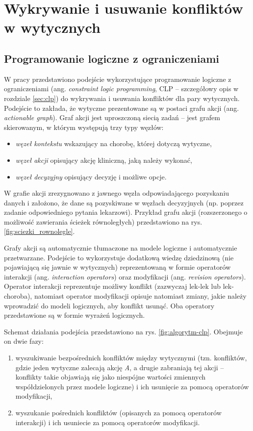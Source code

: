 \section{Wykrywanie i usuwanie konfliktów w wytycznych}

\subsection{Programowanie logiczne z ograniczeniami}

W pracy \cite{SzWilk2} przedstawiono podejście wykorzystujące programowanie logiczne z ograniczeniami (ang. \textit{constraint logic programming}, CLP -- szczegółowy opis w rozdziale \ref{sec:clp}) do wykrywania i usuwania konfliktów dla pary wytycznych. Podejście to zakłada, że wytyczne prezentowane są w postaci grafu akcji (ang. \textit{actionable graph}). Graf akcji jest uproszczoną siecią zadań -- jest grafem skierowanym, w którym występują trzy typy węzłów:
\begin{itemize}
\item \textit{węzeł kontekstu} wskazujący na chorobę, której dotyczą wytyczne,
\item \textit{węzeł akcji} opisujący akcję kliniczną, jaką należy wykonać,
\item \textit{węzeł decyzyjny} opisujący decyzję i możliwe opcje.
\end{itemize}

W grafie akcji zrezygnowano z jawnego węzła odpowiadającego pozyskaniu danych i założono, że dane są pozyskiwane w węzłach decyzyjnych (np. poprzez zadanie odpowiedniego pytania lekarzowi). Przykład grafu akcji (rozszerzonego o możliwość zawierania ścieżek równoległych) przedstawiono na rys. \ref{fig:sciezki_rownolegle}.

Grafy akcji są automatycznie tłumaczone na modele logiczne i automatycznie przetwarzane. Podejście to wykorzystuje dodatkową wiedzę dziedzinową (nie pojawiającą się jawnie w wytycznych) reprezentowaną w formie operatorów interakcji (ang. \textit{interaction operators}) oraz modyfikacji (ang. \textit{revision operators}). Operator interakcji reprezentuje możliwy konflikt (zazwyczaj lek-lek lub lek-choroba), natomiast operator modyfikacji opisuje natomiast zmiany, jakie należy wprowadzić do modeli logicznych, aby konflikt usunąć. Oba operatory przedstawione są w formie wyrażeń logicznych.

Schemat działania podejścia przedstawiono na rys. \ref{fig:algorytm-clp}. Obejmuje on dwie fazy:
\begin{enumerate}
\item wyszukiwanie bezpośrednich konfliktów między wytycznymi (tzn. konfliktów, gdzie jeden wytyczne zalecają akcję \textit{A}, a drugie zabraniają tej akcji -- konflikty takie objawiają się jako niespójne wartości zmiennych współdzielonych przez modele logiczne) i ich usunięcie za pomocą operatorów modyfikacji,
\item wyszukanie pośrednich konfliktów (opisanych za pomocą operatorów interakcji) i ich usuniecie za pomocą operatorów modyfikacji.
\end{enumerate}

